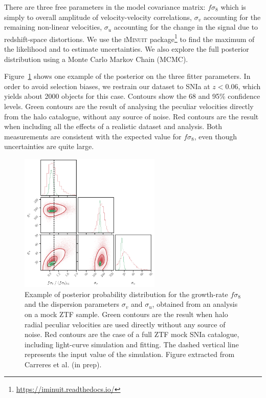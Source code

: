 There are three free parameters in the model covariance matrix: $f\sigma_8$ which is simply to overall 
amplitude of velocity-velocity correlations, $\sigma_v$ accounting for the remaining non-linear 
velocities, $\sigma_u$ accounting for the change in the signal due to redshift-space distortions. 
We use the \textsc{iMinuit} package\footnote{\url{https://iminuit.readthedocs.io/}} to find the maximum 
of the likelihood and to estimate uncertainties. We also explore the full posterior distribution 
using a Monte Carlo Markov Chain (MCMC). 

Figure~\ref{fig:ztf_snsim_posterior} shows one example of the posterior on the three fitter parameters. 
In order to avoid selection biases, we restrain our dataset to SNIa at $z<0.06$, 
which yields about 2000 objects for this case.
Contours show the 68 and 95\% confidence levels. Green contours are the result of analysing the 
peculiar velocities directly from the halo catalogue, without any source of noise. Red contours 
are the result when including all the effects of a realistic dataset and analysis. 
Both measurements are consistent with the expected value for $f\sigma_8$, even though uncertainties 
are quite large.

\begin{figure}[t]
    \centering
    \includegraphics[width=0.6\textwidth]{fig/velocities/bastien_posterior_fs8.png}
    \caption{Example of posterior probability distribution for the growth-rate $f\sigma_8$ 
    and the dispersion parameters $\sigma_v$ and $\sigma_u$, obtained from an analysis 
    on a mock ZTF sample. Green contours are the result when halo radial peculiar velocities 
    are used directly without any source of noise. Red contours are the case of a full ZTF mock 
    SNIa catalogue, including light-curve simulation and fitting. The dashed vertical line represents
    the input value of the simulation.  
    Figure extracted from Carreres et al. (in prep).}
    \label{fig:ztf_snsim_posterior}
\end{figure}

